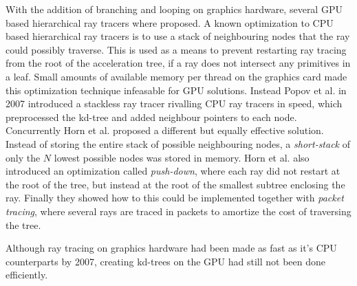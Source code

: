 With the addition of branching and looping on graphics hardware, several GPU
based hierarchical ray tracers where proposed. A known optimization to CPU based
hierarchical ray tracers is to use a stack of neighbouring nodes that the ray
could possibly traverse. This is used as a means to prevent restarting ray
tracing from the root of the acceleration tree, if a ray does not intersect any
primitives in a leaf. Small amounts of available memory per thread on the
graphics card made this optimization technique infeasable for GPU
solutions. Instead Popov et al. in 2007 introduced a
stackless ray tracer rivalling CPU ray tracers in speed, which preprocessed the
kd-tree and added neighbour pointers to each node. Concurrently Horn et
al. proposed a different but equally effective
solution. Instead of storing the entire stack of possible neighbouring nodes, a
\textit{short-stack} of only the $N$ lowest possible nodes was stored in
memory. Horn et al. also introduced an optimization called \textit{push-down},
where each ray did not restart at the root of the tree, but instead at the root
of the smallest subtree enclosing the ray. Finally they showed how to this could
be implemented together with \textit{packet tracing}, where several rays are
traced in packets to amortize the cost of traversing the tree.





Although ray tracing on graphics hardware had been made as fast as
it's CPU counterparts by 2007, creating kd-trees on the GPU had still
not been done efficiently.

